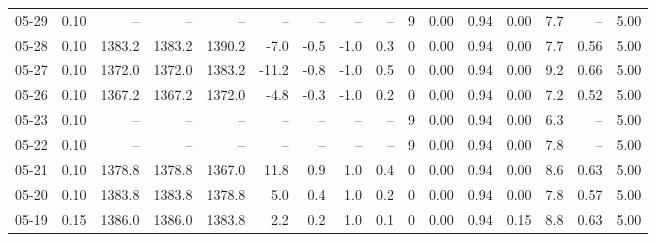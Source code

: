 \begin{threeparttable}
{\begin{tabular}{lrrrrrrrrrrrrrrr}
  05-29 &     0.10 &     -- &     -- &     -- &         -- &             -- &                       -- &                  -- &              9 &       0.00 &      0.94 &           0.00 &              7.7 &              -- &                   5.00 \\
  05-28 &     0.10 & 1383.2 & 1383.2 & 1390.2 &       -7.0 &           -0.5 &                     -1.0 &                 0.3 &              0 &       0.00 &      0.94 &           0.00 &              7.7 &            0.56 &                   5.00 \\
  05-27 &     0.10 & 1372.0 & 1372.0 & 1383.2 &      -11.2 &           -0.8 &                     -1.0 &                 0.5 &              0 &       0.00 &      0.94 &           0.00 &              9.2 &            0.66 &                   5.00 \\
  05-26 &     0.10 & 1367.2 & 1367.2 & 1372.0 &       -4.8 &           -0.3 &                     -1.0 &                 0.2 &              0 &       0.00 &      0.94 &           0.00 &              7.2 &            0.52 &                   5.00 \\
  05-23 &     0.10 &     -- &     -- &     -- &         -- &             -- &                       -- &                  -- &              9 &       0.00 &      0.94 &           0.00 &              6.3 &              -- &                   5.00 \\
  05-22 &     0.10 &     -- &     -- &     -- &         -- &             -- &                       -- &                  -- &              9 &       0.00 &      0.94 &           0.00 &              7.8 &              -- &                   5.00 \\
  05-21 &     0.10 & 1378.8 & 1378.8 & 1367.0 &       11.8 &            0.9 &                      1.0 &                 0.4 &              0 &       0.00 &      0.94 &           0.00 &              8.6 &            0.63 &                   5.00 \\
  05-20 &     0.10 & 1383.8 & 1383.8 & 1378.8 &        5.0 &            0.4 &                      1.0 &                 0.2 &              0 &       0.00 &      0.94 &           0.00 &              7.8 &            0.57 &                   5.00 \\
  05-19 &     0.15 & 1386.0 & 1386.0 & 1383.8 &        2.2 &            0.2 &                      1.0 &                 0.1 &              0 &       0.00 &      0.94 &           0.15 &              8.8 &            0.63 &                   5.00 \\

\end{tabular}}
\end{threeparttable}
